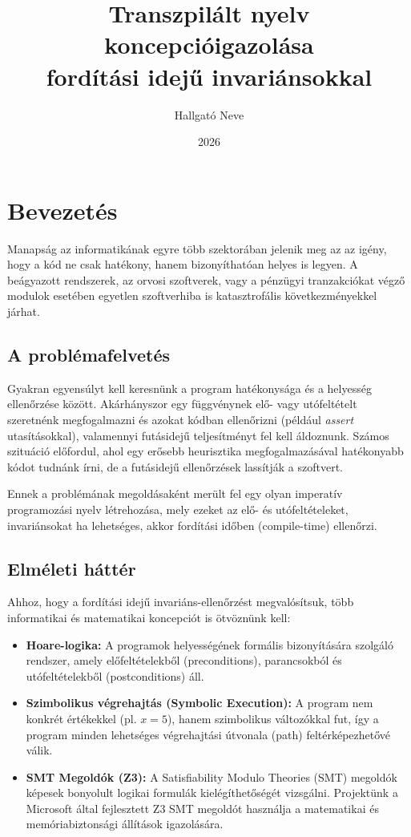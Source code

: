 \documentclass[
    hungarian,
    parspace
]{elteikthesis}
\title{Transzpilált nyelv koncepcióigazolása \\ fordítási idejű invariánsokkal}
\date{2026} %
\author{Hallgató Neve}
\affiliation{Egyetemi docens} %
\begin{document}
\maketitle
\tableofcontents


\chapter{Bevezetés}
Manapság az informatikának egyre több szektorában jelenik meg az az igény, hogy a kód ne csak hatékony, hanem bizonyíthatóan helyes is legyen. A beágyazott rendszerek, az orvosi szoftverek, vagy a pénzügyi tranzakciókat végző modulok esetében egyetlen szoftverhiba is katasztrofális következményekkel járhat. 

\section{A problémafelvetés}
Gyakran egyensúlyt kell keresnünk a program hatékonysága és a helyesség ellenőrzése között. Akárhányszor egy függvénynek elő- vagy utófeltételt szeretnénk megfogalmazni és azokat kódban ellenőrizni (például \textit{assert} utasításokkal), valamennyi futásidejű teljesítményt fel kell áldoznunk. Számos szituáció előfordul, ahol egy erősebb heurisztika megfogalmazásával hatékonyabb kódot tudnánk írni, de a futásidejű ellenőrzések lassítják a szoftvert. 

Ennek a problémának megoldásaként merült fel egy olyan imperatív programozási nyelv létrehozása, mely ezeket az elő- és utófeltételeket, invariánsokat ha lehetséges, akkor fordítási időben (compile-time) ellenőrzi. 

\section{Elméleti háttér}
Ahhoz, hogy a fordítási idejű invariáns-ellenőrzést megvalósítsuk, több informatikai és matematikai koncepciót is ötvöznünk kell:
\begin{itemize}
    \item \textbf{Hoare-logika:} A programok helyességének formális bizonyítására szolgáló rendszer, amely előfeltételekből (preconditions), parancsokból és utófeltételekből (postconditions) áll.
    \item \textbf{Szimbolikus végrehajtás (Symbolic Execution):} A program nem konkrét értékekkel (pl. $x = 5$), hanem szimbolikus változókkal fut, így a program minden lehetséges végrehajtási útvonala (path) feltérképezhetővé válik.
    \item \textbf{SMT Megoldók (Z3):} A Satisfiability Modulo Theories (SMT) megoldók képesek bonyolult logikai formulák kielégíthetőségét vizsgálni. Projektünk a Microsoft által fejlesztett Z3 SMT megoldót használja a matematikai és memóriabiztonsági állítások igazolására.
\end{itemize}
\end{document}
